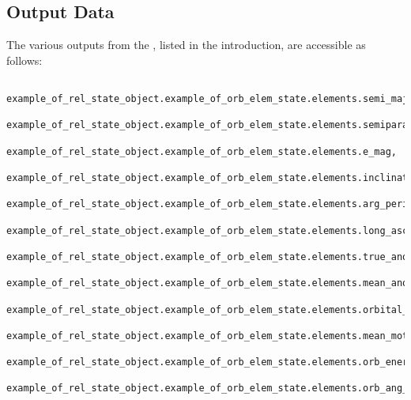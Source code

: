 \subsection{Output Data}
The various outputs from the \OrbElemDesc, listed in the introduction, are accessible as follows:
\begin{verbatim}
   example_of_rel_state_object.example_of_orb_elem_state.elements.semi_major_axis,
   example_of_rel_state_object.example_of_orb_elem_state.elements.semiparam,
   example_of_rel_state_object.example_of_orb_elem_state.elements.e_mag,
   example_of_rel_state_object.example_of_orb_elem_state.elements.inclination,
   example_of_rel_state_object.example_of_orb_elem_state.elements.arg_periapsis,
   example_of_rel_state_object.example_of_orb_elem_state.elements.long_asc_node,
   example_of_rel_state_object.example_of_orb_elem_state.elements.true_anom,
   example_of_rel_state_object.example_of_orb_elem_state.elements.mean_anom,
   example_of_rel_state_object.example_of_orb_elem_state.elements.orbital_anom,
   example_of_rel_state_object.example_of_orb_elem_state.elements.mean_motion,
   example_of_rel_state_object.example_of_orb_elem_state.elements.orb_energy,
   example_of_rel_state_object.example_of_orb_elem_state.elements.orb_ang_momentum.
\end{verbatim}


